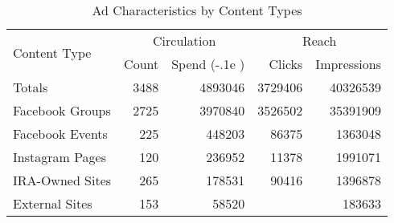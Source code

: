 \documentclass{article}
\def\Ruble{\stackengine{.67ex}{%
	\stackengine{.48ex}{\textsf{P}}{\rule{.8ex}{.12ex}\kern.6ex}{O}{r}{F}{F}{L}%
	}{\rule{.8ex}{.12ex}\kern.6ex}{O}{r}{F}{F}{L}\kern-.1e
}
\begin{document}
  
\thispagestyle{empty}
\listoftables
\listoffigures
\listofalgorithms

\clearpage
  
\begin{table}[h]\centering
	\caption{Ad Characteristics by Content Types}
	\begin{tabular}{lrrrr}
		\toprule
		\multirow{2}[3]{*}{Content Type} & \multicolumn{2}{c}{Circulation} & \multicolumn{2}{c}{Reach} \\
		\cmidrule(lr){2-3} \cmidrule(lr){4-5}
		                & Count      & Spend (\Ruble) & Clicks        & Impressions    \\
		\midrule
		Totals          & \num{3488} & \num{4893046}  & \num{3729406} & \num{40326539} \\ 
		\midrule
		Facebook Groups & \num{2725} & \num{3970840}  & \num{3526502} & \num{35391909} \\
		Facebook Events & \num{225}  & \num{448203}   & \num{86375}   & \num{1363048}  \\
		Instagram Pages & \num{120}  & \num{236952}   & \num{11378}   & \num{1991071}  \\
		IRA-Owned Sites & \num{265}  & \num{178531}   & \num{90416}   & \num{1396878}  \\
		External Sites  & \num{153}  & \num{58520}    & \num{}        & \num{183633}   \\
		\bottomrule
	\end{tabular}
\end{table}

\clearpage
\end{document}
